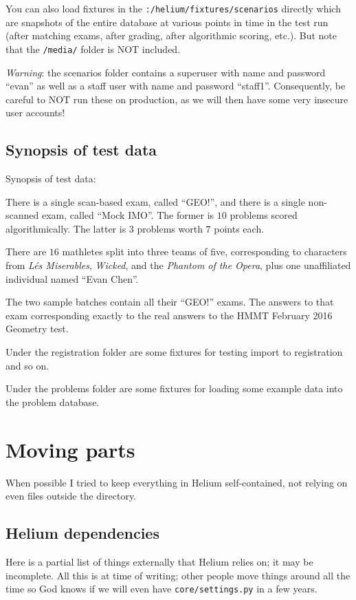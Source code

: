 You can also load fixtures in the \verb+:/helium/fixtures/scenarios+ directly
which are snapshots of the entire database at various points in time
in the test run
(after matching exams, after grading, after algorithmic scoring, etc.).
But note that the \verb+/media/+ folder is NOT included.

\emph{Warning}: the scenarios folder contains a superuser
with name and password ``evan''
as well as a staff user with name and password ``staff1''.
Consequently, be careful to NOT run these on production,
as we will then have some very insecure user accounts!

\subsection{Synopsis of test data}
Synopsis of test data:

\begin{itemize}
\ii There is a single scan-based exam, called ``GEO!'',
and there is a single non-scanned exam, called ``Mock IMO''.
The former is $10$ problems scored algorithmically.
The latter is $3$ problems worth $7$ points each.

\ii There are $16$ mathletes split into three teams of five,
corresponding to characters from \emph{L\'{e}s Miserables},
\emph{Wicked}, and the \emph{Phantom of the Opera},
plus one unaffiliated individual named ``Evan Chen''.

\ii The two sample batches contain all their ``GEO!'' exams.
The answers to that exam corresponding exactly to the real answers
to the HMMT February 2016 Geometry test.

\ii Under the registration folder are some fixtures for testing
import to registration and so on.

\ii Under the problems folder are some fixtures for loading
some example data into the problem database.
\end{itemize}

\section{Moving parts}
When possible I tried to keep everything in Helium 
self-contained, not relying on even files outside the directory.

\subsection{Helium dependencies}
Here is a partial list of things externally that Helium relies on;
it may be incomplete.
All this is at time of writing;
other people move things around all the time so God knows
if we will even have \texttt{core/settings.py} in a few years.

